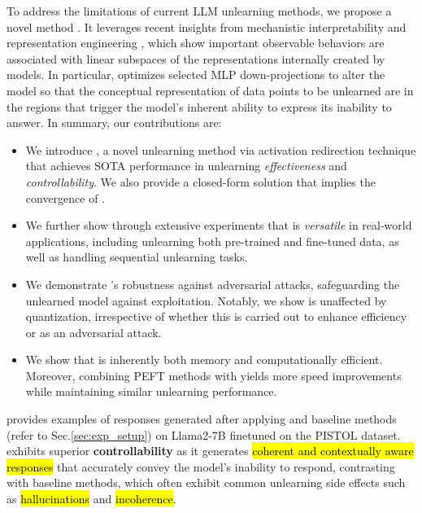 To address the limitations of current LLM unlearning methods, we propose a novel method \lunar. It leverages recent insights from mechanistic interpretability and representation engineering \citep{zou2023representation}, which show important observable behaviors are associated with linear subspaces of the representations internally created by models. In particular, \lunar optimizes selected MLP down-projections to alter the model so that the conceptual representation of data points to be unlearned are in the regions that trigger the model’s inherent ability to express its inability to answer. In summary, our contributions are:
\begin{itemize}
    \vspace{-2mm}
    \item We introduce \lunar, a novel unlearning method via activation redirection technique that achieves SOTA performance in unlearning \textit{effectiveness} and \textit{controllability}. We also provide a closed-form solution that implies the convergence of \lunar. %
    \vspace{-2mm}
    \item We further show through extensive experiments that \lunar is \textit{versatile} in real-world applications, including unlearning both pre-trained and fine-tuned data, as well as handling sequential unlearning tasks.
    \vspace{-2mm}
    \item We demonstrate \lunar's robustness against adversarial attacks, safeguarding the unlearned model against exploitation. Notably, we show \lunar is unaffected by quantization, irrespective of whether this is carried out to enhance efficiency or as an adversarial attack.
    \vspace{-2mm}
    \item We show that \lunar is inherently both memory and computationally efficient. Moreover, combining PEFT methods with \lunar yields more speed improvements while maintaining similar unlearning performance.
\end{itemize}


\begin{table}[ht]
    \setlength{\abovecaptionskip}{10pt} %
    \setlength{\belowcaptionskip}{-10pt} %
    \captionsetup{font=small,labelfont=bf}
    \centering    
    \caption{provides examples of responses generated after applying \lunar and baseline methods (refer to Sec.\ref{sec:exp_setup}) on Llama2-7B finetuned on the PISTOL dataset. \lunar exhibits superior \textbf{controllability} as it generates \hl{coherent and contextually aware responses} that accurately convey the model’s inability to respond, contrasting with baseline methods, which often exhibit common unlearning side effects such as \hl{hallucinations} and \hl{incoherence}.}
    \label{tab:pistol_examples}
\end{table}


